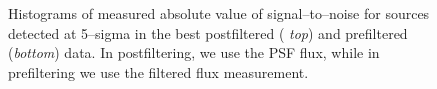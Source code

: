 \documentclass[prd, nofootinbib, floatfix, 11pt,tightenlines,times]{article}
\begin{document}
\begin{figure}
\begin{center}
 \\
 \\
\end{center}
\caption{Histograms of measured absolute value of signal--to--noise
  for sources detected at 5--sigma in the best postfiltered ({\it
    top}) and prefiltered ({\it bottom}) data.  In postfiltering, we
  use the PSF flux, while in prefiltering we use the filtered flux
  measurement.  }
\label{fluxerr}
\end{figure}
\end{document}
